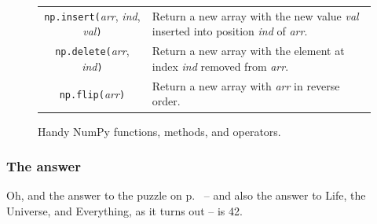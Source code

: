 \begin{figure}[ht]
\begin{tabular}{c|p{3.3in}}
\texttt{np.insert(}\textsl{arr}, \textsl{ind}, \textsl{val}\texttt{)} &
    Return a new array with the new value \textsl{val} inserted into position \textsl{ind} of \textsl{arr}. \\

\texttt{np.delete(}\textsl{arr}, \textsl{ind}\texttt{)} &
    Return a new array with the element at index \textsl{ind} removed from \textsl{arr}. \\

\texttt{np.flip(}\textsl{arr}\texttt{)} &
    Return a new array with \textsl{arr} in reverse order. \\
\end{tabular}
\bigskip
\caption{Handy NumPy functions, methods, and operators.}
\label{fig:handyNumPy}
\end{figure}

\subsubsection{The answer}

Oh, and the answer to the puzzle on p.~\pageref{indexTest} -- and also the
answer to Life, the Universe, and Everything, as it turns out -- is 42.

